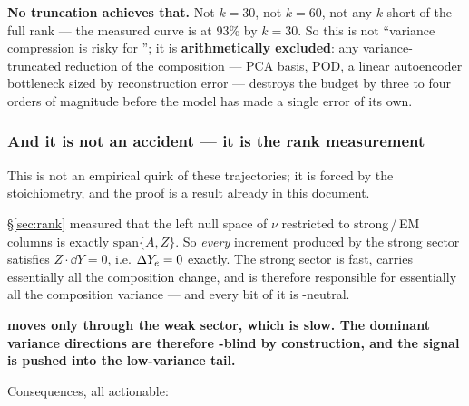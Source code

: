 \textbf{No truncation achieves that.} Not $k = 30$, not $k = 60$, not any $k$
short of the full rank --- the measured curve is at 93\% by $k = 30$. So this is
not ``variance compression is risky for \Ye''; it is \textbf{arithmetically
excluded}: any variance-truncated reduction of the composition --- PCA basis,
POD, a linear autoencoder bottleneck sized by reconstruction error --- destroys
the \Ye{} budget by three to four orders of magnitude before the model has made
a single error of its own.

\subsubsection{And it is not an accident --- it is the rank measurement}
\label{sec:effdim-stoich}

This is not an empirical quirk of these trajectories; it is forced by the
stoichiometry, and the proof is a result already in this document.

\S\ref{sec:rank} measured that the left null space of $\nu$ restricted to
strong\,/\,EM columns is exactly $\mathrm{span}\{A, Z\}$. So \emph{every}
increment produced by the strong sector satisfies $Z\cdot \dd Y = 0$, i.e.
$\Delta Y_{e} = 0$ exactly. The strong sector is fast, carries essentially all the
composition change, and is therefore responsible for essentially all the
composition variance --- and every bit of it is \Ye-neutral.

\begin{result}
\textbf{\Ye{} moves only through the weak sector, which is slow. The dominant
variance directions are therefore \Ye-blind by construction, and the \Ye{}
signal is pushed into the low-variance tail.}\derivedhere
\end{result}

Consequences, all actionable:

